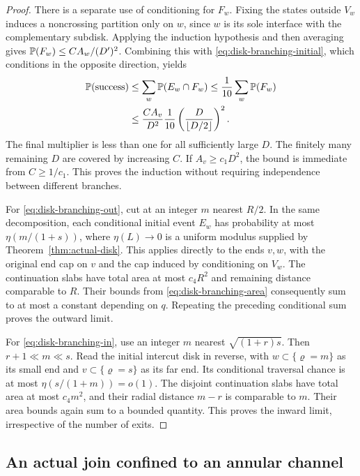 \begin{proof}
There is a separate use of conditioning for $F_w$.  Fixing the states
outside $V_w$ induces a noncrossing partition only on $w$, since $w$ is
its sole interface with the complementary subdisk.  Applying the
induction hypothesis and then averaging gives
$\mathbb P(F_w)\le C A_w/(D')^2$.  Combining this with
\eqref{eq:disk-branching-initial}, which conditions in the opposite
direction, yields
\begin{align*}
 \mathbb P(\text{success})
 &\le \sum_w\mathbb P(E_w\cap F_w)
 \le \frac1{10}\sum_w\mathbb P(F_w)\\
 &\le \frac{C A_v}{D^2}
        \frac1{10}\left(\frac{D}{\lfloor D/2\rfloor}\right)^2.
\end{align*}
The final multiplier is less than one for all sufficiently large $D$.
The finitely many remaining $D$ are covered by increasing $C$.
If $A_v\ge c_1D^2$, the bound is immediate from $C\ge1/c_1$.
This proves the induction without requiring independence between
different branches.

For \eqref{eq:disk-branching-out}, cut at an integer $m$ nearest $R/2$.
In the same decomposition, each conditional initial event $E_w$ has
probability at most $\eta(m/(1+s))$, where $\eta(L)\to0$ is a uniform
modulus supplied by Theorem~\ref{thm:actual-disk}.  This applies directly
to the ends $v,w$, with the original end cap on $v$ and the cap induced
by conditioning on $V_w$.  The continuation slabs have total area at
most $c_4 R^2$ and remaining distance comparable to $R$.  Their bounds
from \eqref{eq:disk-branching-area} consequently sum to at most a
constant depending on $q$.  Repeating the preceding conditional sum
proves the outward limit.

For \eqref{eq:disk-branching-in}, use an integer $m$ nearest
$\sqrt{(1+r)s}$.  Then $r+1\ll m\ll s$.  Read the initial intercut disk
in reverse, with $w\subset\{\varrho=m\}$ as its small end and
$v\subset\{\varrho=s\}$ as its far end.  Its conditional traversal chance
is at most $\eta(s/(1+m))=o(1)$.  The disjoint continuation slabs have
total area at most $c_4 m^2$, and their radial distance $m-r$ is comparable
to $m$.  Their area bounds again sum to a bounded quantity.  This proves
the inward limit, irrespective of the number of exits.
\end{proof}

\subsection{An actual join confined to an annular channel}


